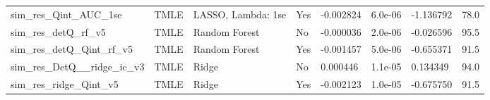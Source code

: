 \begin{longtable}[l]{llllllll}
sim\_res\_Qint\_AUC\_1se & TMLE & LASSO, Lambda: 1se & Yes & -0.002824 & 6.0e-06 & -1.136792 & 78.0\\
sim\_res\_detQ\_rf\_v5 & TMLE & Random Forest & No & -0.000036 & 2.0e-06 & -0.026596 & 95.5\\
sim\_res\_detQ\_Qint\_rf\_v5 & TMLE & Random Forest & Yes & -0.001457 & 5.0e-06 & -0.655371 & 91.5\\
sim\_res\_DetQ\_\_ridge\_ic\_v3 & TMLE & Ridge & No & 0.000446 & 1.1e-05 & 0.134349 & 94.0\\
sim\_res\_ridge\_Qint\_v5 & TMLE & Ridge & Yes & -0.002123 & 1.0e-05 & -0.675750 & 91.5\\
\bottomrule
\end{longtable}
